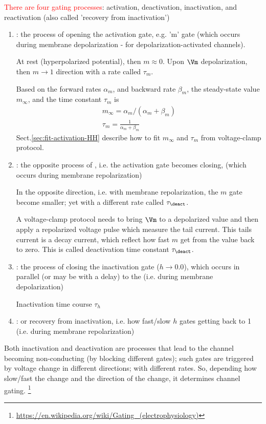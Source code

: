 \textcolor{red}{There are four gating processes}: activation, deactivation,
inactivation, and reactivation (also called 'recovery from inactivation')
\begin{enumerate}
  \item \activation: the process of opening the activation gate, e.g. 'm' gate
  (which occurs during membrane depolarization - for depolarization-activated
  channels).
  
  At rest (hyperpolarized potential), then $m \approx 0$. Upon $\Vm$
  depolarization, then $m \rightarrow 1$ direction with a rate called $\tau_m$.

 Based on the forward rates $\alpha_m$, and backward rate $\beta_m$, the
 steady-state value $m_\infty$, and the time constant $\tau_m$ is 
 \begin{equation}
 \begin{split}
 m_\infty = \alpha_m / (\alpha_m + \beta_m) \\
 \tau_m = \frac{1}{\alpha_m + \beta_m}
 \end{split}
 \end{equation}
 Sect.\ref{sec:fit-activation-HH} describe how to fit $m_\infty$ and $\tau_m$
 from voltage-clamp protocol. 
  
  \item \deactivation: the opposite process of \activation, i.e. the activation
  gate becomes closing, (which occurs during membrane repolarization)
  
 In the opposite direction, i.e. with membrane repolarization, the $m$ gate
 become smaller; yet with a different rate called $\tau_\deact$.
  
 A voltage-clamp protocol needs to bring $\Vm$ to a depolarized value and
 then apply a repolarized voltage pulse which measure the tail current. This
 tails current is a decay current, which reflect how fast $m$ get from the value
 back to zero. This is called deactivation time constant $\tau_\deact$.
  \item \inactivation: the process of closing the inactivation gate
  ($h\rightarrow 0.0$), which occurs in parallel (or may be with a delay) to the 
  \activation (i.e. during membrane depolarization)
  
  Inactivation time course $\tau_h$
  
  \item \reactivation: or recovery from inactivation, i.e. how fast/slow $h$
  gates getting back to 1 (i.e. during membrane repolarization)
  
  
\end{enumerate}
Both inactivation and deactivation are processes that lead to the channel
becoming non-conducting (by blocking different gates); such gates are triggered
by voltage change in different directions; with different rates. So, depending
how slow/fast the change and the direction of the change, it determines channel
gating.
\footnote{\url{https://en.wikipedia.org/wiki/Gating_(electrophysiology)}}


